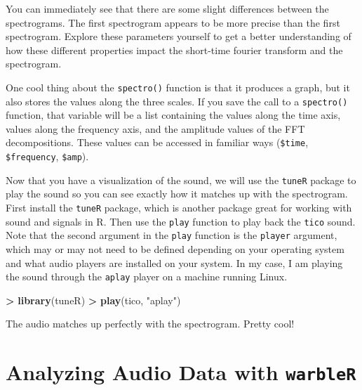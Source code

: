 \documentclass[]{krantz}
\makeatletter
\newenvironment{Shaded}{\begin{snugshade}}{\end{snugshade}}
\newcommand{\KeywordTok}[1]{\textcolor[rgb]{0.27,0.27,0.27}{\textbf{#1}}}
\newcommand{\NormalTok}[1]{#1}
\newcommand{\OperatorTok}[1]{\textcolor[rgb]{0.43,0.43,0.43}{\textbf{#1}}}
\newcommand{\StringTok}[1]{\textcolor[rgb]{0.5,0.5,0.5}{#1}}
\newenvironment{kframe}{%
\medskip{}
\setlength{\fboxsep}{.8em}
 \def\at@end@of@kframe{}%
 \ifinner\ifhmode%
  \def\at@end@of@kframe{\end{minipage}}%
  \begin{minipage}{\columnwidth}%
 \fi\fi%
 \def\FrameCommand##1{\hskip\@totalleftmargin \hskip-\fboxsep
 \colorbox{shadecolor}{##1}\hskip-\fboxsep
     \hskip-\linewidth \hskip-\@totalleftmargin \hskip\columnwidth}%
 \MakeFramed {\advance\hsize-\width
   \@totalleftmargin\z@ \linewidth\hsize
   \@setminipage}}%
 {\par\unskip\endMakeFramed%
 \at@end@of@kframe}
\renewenvironment{Shaded}{\begin{kframe}}{\end{kframe}}
\makeatother
\begin{document}
You can immediately see that there are some slight differences between the spectrograms. The first spectrogram appears to be more precise than the first spectrogram. Explore these parameters yourself to get a better understanding of how these different properties impact the short-time fourier transform and the spectrogram.

One cool thing about the \texttt{spectro()} function is that it produces a graph, but it also stores the values along the three scales. If you save the call to a \texttt{spectro()} function, that variable will be a list containing the values along the time axis, values along the frequency axis, and the amplitude values of the FFT decompositions. These values can be accessed in familiar ways (\texttt{\$time}, \texttt{\$frequency}, \texttt{\$amp}).

Now that you have a visualization of the sound, we will use the \texttt{tuneR} package to play the sound so you can see exactly how it matches up with the spectrogram. First install the \texttt{tuneR} package, which is another package great for working with sound and signals in R. Then use the \texttt{play} function to play back the \texttt{tico} sound. Note that the second argument in the \texttt{play} function is the \texttt{player} argument, which may or may not need to be defined depending on your operating system and what audio players are installed on your system. In my case, I am playing the sound through the \texttt{aplay} player on a machine running Linux.

\begin{Shaded}
\begin{Highlighting}[]
\OperatorTok{>}\StringTok{ }\KeywordTok{library}\NormalTok{(tuneR)}
\OperatorTok{>}\StringTok{ }\KeywordTok{play}\NormalTok{(tico, }\StringTok{"aplay"}\NormalTok{)}
\end{Highlighting}
\end{Shaded}

The audio matches up perfectly with the spectrogram. Pretty cool!

\hypertarget{analyzing-audio-data-with-warbler}{%
\section{\texorpdfstring{Analyzing Audio Data with \texttt{warbleR}}{Analyzing Audio Data with warbleR}}\label{analyzing-audio-data-with-warbler}}
\end{document}
